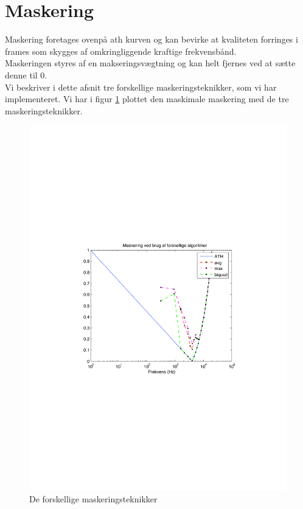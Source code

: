 \section{Maskering}
\label{sec.masking}
Maskering foretages ovenpå ath kurven og kan bevirke at kvaliteten
forringes i frames som skygges af omkringliggende kraftige
frekvensbånd.\\
Maskeringen styres af en makseringsvægtning og kan helt fjernes ved
at sætte denne til 0.\\

Vi beskriver i dette afsnit tre forskellige maskeringsteknikker, som vi har implementeret. Vi har i figur \ref{fig.mask} plottet den maskimale maskering med de tre  maskeringsteknikker.

\begin{figure}[h!]
\begin{center}
\includegraphics[width=12cm]{mask}
\end{center}
\caption{De forskellige maskeringsteknikker}
\label{fig.mask}
\end{figure}


